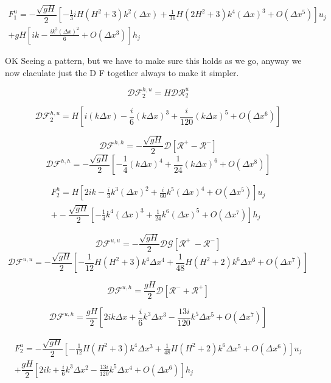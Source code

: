 \documentclass[12pt]{article}
\begin{document}
\begin{multline}
F^u_1 =- \dfrac{ \sqrt{gH}}{ 2}  \left [-\frac{1}{3}iH(H^2 + 3) k^2( \Delta x) + \frac{1}{36}H(2H^2 + 3)k^4(\Delta x)^3 + O( \Delta x^5)  \right ]u_j\\ + gH \left[ik -\frac{i k^3(\Delta x)^2}{6} +  O( \Delta x^3) \right]h_j
\end{multline}

OK Seeing a pattern, but we have to make sure this holds as we go, anyway we now claculate just the D F together always to make it simpler. 

\[\mathcal{D}\mathcal{F}_2^{h,u} = H\mathcal{D}\mathcal{R}_2^u\]

\[\mathcal{D}\mathcal{F}_2^{h,u} = H\left[i(k \Delta x) - \frac{i}{6}(k \Delta x)^3 + \frac{i}{120} (k \Delta x)^5 + O(\Delta x ^6) \right]\]

\[\mathcal{D}\mathcal{F}^{h,h} = -\dfrac{ \sqrt{gH}}{ 2}  \mathcal{D}\left [ \mathcal{R}^+- \mathcal{R}^- \right ]\]
\[\mathcal{D}\mathcal{F}^{h,h} = -\dfrac{ \sqrt{gH}}{ 2}  \left [ -\frac{1}{4} (k\Delta x)^4  + \frac{1}{24} (k\Delta x)^6 + O(\Delta x^8) \right ]\]

\begin{multline}
F^h_2 =H\left[2ik - \frac{i}{3} k^3(\Delta x)^2 + \frac{i}{60} k^5(\Delta x)^4 + O(\Delta x ^5) \right] u_j\\ + -\dfrac{ \sqrt{gH}}{ 2} \left [ -\frac{1}{4} k^4(\Delta x)^3  + \frac{1}{24}k^6 (\Delta x)^5 + O(\Delta x^7)\right ]h_j
\end{multline}

\[\mathcal{D}\mathcal{F}^{u,u} = - \dfrac{ \sqrt{gH}}{ 2} \mathcal{D}\mathcal{G} \left [ \mathcal{R}^+ \ -  \mathcal{R}^-  \right ]\]
\[\mathcal{D}\mathcal{F}^{u,u} = - \dfrac{ \sqrt{gH}}{ 2} \left[ -\frac{1}{12}H(H^2 +3)k^4 \Delta x^4 + \frac{1}{48}H(H^2 +2)k^6 \Delta x^6 + O(\Delta x ^7) \right ]\]

\[\mathcal{D}\mathcal{F}^{u,h} = \dfrac{ gH}{ 2}\mathcal{D} [\mathcal{R}^- + \mathcal{R}^+] \]
 
\[\mathcal{D}\mathcal{F}^{u,h} = \dfrac{ gH}{ 2}\left[2 i k \Delta x + \frac{i}{6}  k^3 \Delta x^3 - \frac{13i}{120}  k^5 \Delta x^5 + O(\Delta x ^7) \right] \]

\begin{multline}
F^u_2 = - \dfrac{ \sqrt{gH}}{ 2} \left[ -\frac{1}{12}H(H^2 +3)k^4 \Delta x^3 + \frac{1}{48}H(H^2 +2)k^6 \Delta x^5 + O(\Delta x ^6) \right ]u_j\\+ \dfrac{ gH}{ 2}\left[2 i k + \frac{i}{6}  k^3 \Delta x^2 - \frac{13i}{120}  k^5 \Delta x^4 + O(\Delta x ^6) \right]h_j
\end{multline}
\end{document}
